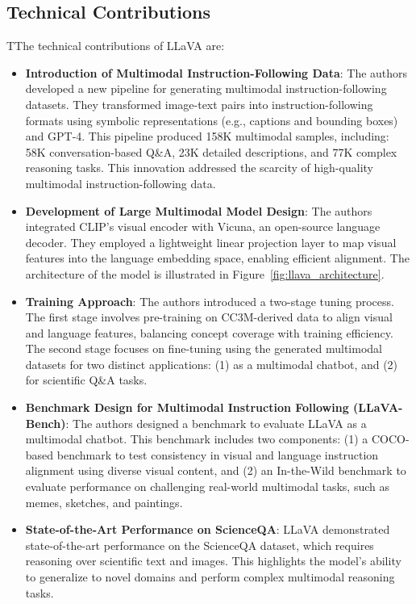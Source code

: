 \documentclass[onecolumn]{IEEEtran}
\begin{document}
\subsection{Technical Contributions}
TThe technical contributions of LLaVA are:
\begin{itemize}
    \item \textbf{Introduction of Multimodal Instruction-Following Data}: The authors developed a new pipeline for generating multimodal instruction-following datasets. They transformed image-text pairs into instruction-following formats using symbolic representations (e.g., captions and bounding boxes) and GPT-4. This pipeline produced 158K multimodal samples, including: 58K conversation-based Q\&A, 23K detailed descriptions, and 77K complex reasoning tasks. This innovation addressed the scarcity of high-quality multimodal instruction-following data.
    \item \textbf{Development of Large Multimodal Model Design}: The authors integrated CLIP's visual encoder with Vicuna, an open-source language decoder. They employed a lightweight linear projection layer to map visual features into the language embedding space, enabling efficient alignment. The architecture of the model is illustrated in Figure~\ref{fig:llava_architecture}.
    \item \textbf{Training Approach}: The authors introduced a two-stage tuning process. The first stage involves pre-training on CC3M-derived data to align visual and language features, balancing concept coverage with training efficiency. The second stage focuses on fine-tuning using the generated multimodal datasets for two distinct applications: (1) as a multimodal chatbot, and (2) for scientific Q\&A tasks.
    \item \textbf{Benchmark Design for Multimodal Instruction Following (LLaVA-Bench)}: The authors designed a benchmark to evaluate LLaVA as a multimodal chatbot. This benchmark includes two components: (1) a COCO-based benchmark to test consistency in visual and language instruction alignment using diverse visual content, and (2) an In-the-Wild benchmark to evaluate performance on challenging real-world multimodal tasks, such as memes, sketches, and paintings.
    \item \textbf{State-of-the-Art Performance on ScienceQA}: LLaVA demonstrated state-of-the-art performance on the ScienceQA dataset, which requires reasoning over scientific text and images. This highlights the model’s ability to generalize to novel domains and perform complex multimodal reasoning tasks.
\end{itemize}
\end{document}
